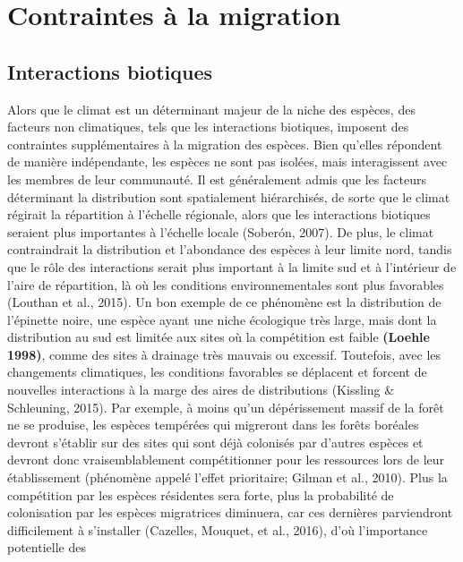 \documentclass[
]{article}
\begin{document}
\hypertarget{contraintes-uxe0-la-migration}{%
\section{Contraintes à la
migration}\label{contraintes-uxe0-la-migration}}

\hypertarget{interactions-biotiques}{%
\subsection{Interactions biotiques}\label{interactions-biotiques}}

Alors que le climat est un déterminant majeur de la niche des espèces,
des facteurs non climatiques, tels que les interactions biotiques,
imposent des contraintes supplémentaires à la migration des espèces.
Bien qu'elles répondent de manière indépendante, les espèces ne sont pas
isolées, mais interagissent avec les membres de leur communauté. Il est
généralement admis que les facteurs déterminant la distribution sont
spatialement hiérarchisés, de sorte que le climat régirait la
répartition à l'échelle régionale, alors que les interactions biotiques
seraient plus importantes à l'échelle locale (Soberón, 2007). De plus,
le climat contraindrait la distribution et l'abondance des espèces à
leur limite nord, tandis que le rôle des interactions serait plus
important à la limite sud et à l'intérieur de l'aire de répartition, là
où les conditions environnementales sont plus favorables (Louthan et
al., 2015). Un bon exemple de ce phénomène est la distribution de
l'épinette noire, une espèce ayant une niche écologique très large, mais
dont la distribution au sud est limitée aux sites où la compétition est
faible \textbf{(Loehle 1998)}, comme des sites à drainage très mauvais
ou excessif. Toutefois, avec les changements climatiques, les conditions
favorables se déplacent et forcent de nouvelles interactions à la marge
des aires de distributions (Kissling \& Schleuning, 2015). Par exemple,
à moins qu'un dépérissement massif de la forêt ne se produise, les
espèces tempérées qui migreront dans les forêts boréales devront
s'établir sur des sites qui sont déjà colonisés par d'autres espèces et
devront donc vraisemblablement compétitionner pour les ressources lors
de leur établissement (phénomène appelé l'effet prioritaire; Gilman et
al., 2010). Plus la compétition par les espèces résidentes sera forte,
plus la probabilité de colonisation par les espèces migratrices
diminuera, car ces dernières parviendront difficilement à s'installer
(Cazelles, Mouquet, et al., 2016), d'où l'importance potentielle des
\end{document}
